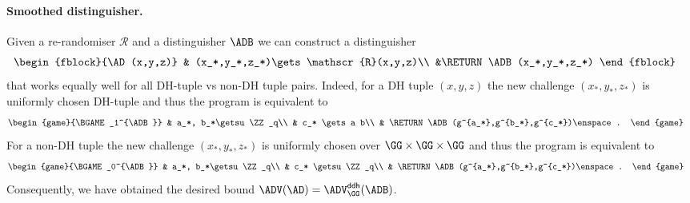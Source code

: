 \documentclass{crypto-exercise}
\newcommand{\RERAND}{\mathscr{R}}
\begin{document}
\begin{solution}
\paragraph{Smoothed distinguisher.}
Given a re-randomiser $\RERAND$ and a distinguisher $\ADB$ we can construct a distinguisher
\begin{align*}
    &\begin{fblock}{\AD(x,y,z)}
      & (x_*,y_*,z_*)\gets \RERAND(x,y,z)\\
      &\RETURN \ADB(x_*,y_*,z_*)
    \end{fblock}
\end{align*}
that works equally well for all DH-tuple vs non-DH tuple pairs. Indeed, for a DH tuple $(x,y,z)$ the new challenge $(x_*,y_*,z_*)$ is uniformly chosen DH-tuple and thus the program is equivalent to  
\begin{align*}
   &\begin{game}{\BGAME_1^{\ADB}}
      & a_*, b_*\getsu \ZZ_q\\
      & c_* \gets a b\\
      & \RETURN \ADB(g^{a_*},g^{b_*},g^{c_*})\enspace.
    \end{game}
\end{align*}  
For a non-DH tuple the new challenge $(x_*,y_*,z_*)$ is uniformly chosen over $\GG\times\GG\times\GG$ and thus the program is equivalent to  
\begin{align*}
   &\begin{game}{\BGAME_0^{\ADB}}
      & a_*, b_*\getsu \ZZ_q\\
      & c_* \getsu \ZZ_q\\
      & \RETURN \ADB(g^{a_*},g^{b_*},g^{c_*})\enspace.
    \end{game}
\end{align*} 
Consequently, we have obtained the desired bound $\ADV(\AD)=\ADVDDH{\GG}{\ADB}$.

 
 

\end{solution}
\end{document}
